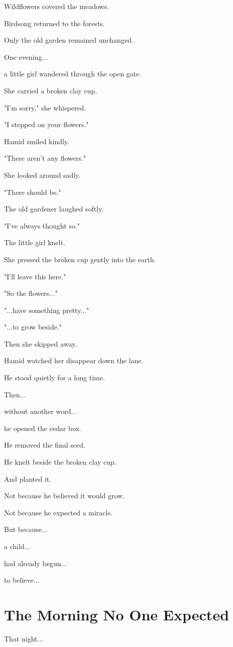\documentclass[12pt,openany]{book}
\begin{document}
Wildflowers covered the meadows.

Birdsong returned to the forests.

Only the old garden remained unchanged.

One evening...

a little girl wandered through the open gate.

She carried a broken clay cup.

"I'm sorry," she whispered.

"I stepped on your flowers."

Hamid smiled kindly.

"There aren't any flowers."

She looked around sadly.

"There should be."

The old gardener laughed softly.

"I've always thought so."

The little girl knelt.

She pressed the broken cup gently into the earth.

"I'll leave this here."

"So the flowers..."

"...have something pretty..."

"...to grow beside."

Then she skipped away.

Hamid watched her disappear down the lane.

He stood quietly for a long time.

Then...

without another word...

he opened the cedar box.

He removed the final seed.

He knelt beside the broken clay cup.

And planted it.

Not because he believed it would grow.

Not because he expected a miracle.

But because...

a child...

had already begun...

to believe...
\section*{The Morning No One Expected}

That night...
\end{document}
